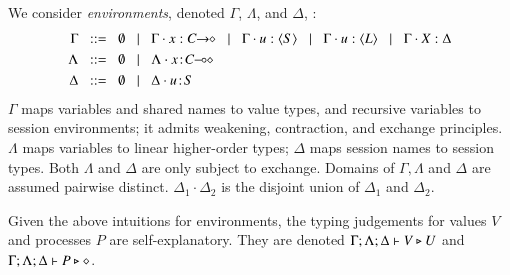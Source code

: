 \documentclass[preprint,11pt]{elsarticle}
\begin{document}
We consider 
\emph{environments}, denoted $\Gamma$, $\Lambda$, and $\Delta$, :
\begin{align*}
		\Gamma  & \bnfis  \emptyset \bnfbar \Gamma \cat \varp{x}: \shot{C} \bnfbar \Gamma \cat u: \chtype{S} \bnfbar \Gamma \cat u: \chtype{L} 
		\bnfbar \Gamma \cat \rvar{X}: \Delta
\\
		\Lambda & \bnfis  \emptyset \bnfbar \Lambda \cat \AT{x}{\lhot{C}}
		 \\
		\Delta   & \bnfis   \emptyset \bnfbar \Delta \cat \AT{u}{S}
\end{align*}
$\Gamma$ maps variables and shared names to value types, and recursive 
variables to session environments; %
it admits weakening, contraction, and exchange principles.
$\Lambda$ maps variables to 
linear
higher-order
types;   $\Delta$  maps   
session names to session types. 
Both $\Lambda$ and $\Delta$
are
only subject to exchange.  
Domains of $\Gamma,
\Lambda$ and $\Delta$ are assumed pairwise distinct. 
$\Delta_1\cdot \Delta_2$ is the disjoint union of $\Delta_1$ and $\Delta_2$.  

Given the above intuitions for environments, 
the typing judgements for values $V$ and processes $P$ are self-explanatory.
They are denoted 
$\Gamma; \Lambda; \Delta \vdash V \triangleright U$ and $\Gamma; \Lambda; \Delta \vdash P \triangleright \diamond$.
%
 


\end{document}
